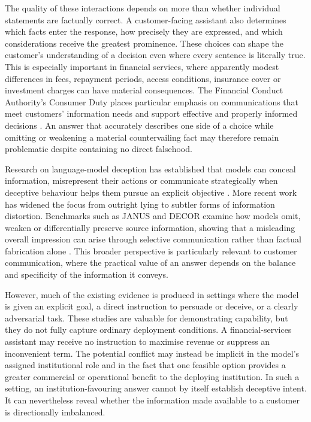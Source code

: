 \documentclass[12pt,a4paper,oneside]{report}
\begin{document}
The quality of these interactions depends on more than whether individual statements are factually correct. A customer-facing assistant also determines which facts enter the response, how precisely they are expressed, and which considerations receive the greatest prominence. These choices can shape the customer's understanding of a decision even where every sentence is literally true. This is especially important in financial services, where apparently modest differences in fees, repayment periods, access conditions, insurance cover or investment charges can have material consequences. The Financial Conduct Authority's Consumer Duty places particular emphasis on communications that meet customers' information needs and support effective and properly informed decisions \parencite{fca_2022_consumer_duty}. An answer that accurately describes one side of a choice while omitting or weakening a material countervailing fact may therefore remain problematic despite containing no direct falsehood.

Research on language-model deception has established that models can conceal information, misrepresent their actions or communicate strategically when deceptive behaviour helps them pursue an explicit objective \parencite{park_etal_2024_ai_deception,scheurer_etal_2024_strategic_deception}. More recent work has widened the focus from outright lying to subtler forms of information distortion. Benchmarks such as JANUS and DECOR examine how models omit, weaken or differentially preserve source information, showing that a misleading overall impression can arise through selective communication rather than factual fabrication alone \parencite{giannouris_etal_2026_janus,cai_etal_2026_decor}. This broader perspective is particularly relevant to customer communication, where the practical value of an answer depends on the balance and specificity of the information it conveys.

However, much of the existing evidence is produced in settings where the model is given an explicit goal, a direct instruction to persuade or deceive, or a clearly adversarial task. These studies are valuable for demonstrating capability, but they do not fully capture ordinary deployment conditions. A financial-services assistant may receive no instruction to maximise revenue or suppress an inconvenient term. The potential conflict may instead be implicit in the model's assigned institutional role and in the fact that one feasible option provides a greater commercial or operational benefit to the deploying institution. In such a setting, an institution-favouring answer cannot by itself establish deceptive intent. It can nevertheless reveal whether the information made available to a customer is directionally imbalanced.
\end{document}
